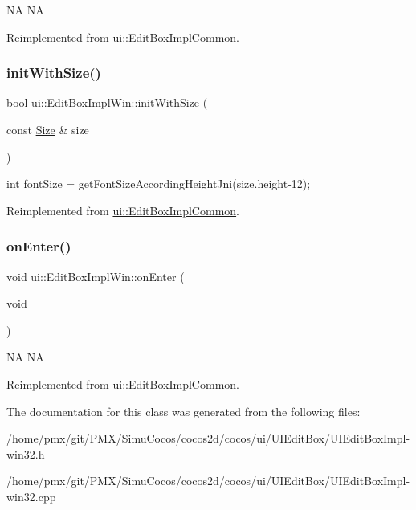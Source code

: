 NA  NA 

Reimplemented from \hyperlink{classui_1_1EditBoxImplCommon_a778a70b2785868a3b8e6953c95277573}{ui\+::\+Edit\+Box\+Impl\+Common}.

\mbox{\label{classui_1_1EditBoxImplWin_a347c134210f455ba359bea055277505e}} 
\subsubsection{\texorpdfstring{init\+With\+Size()}{initWithSize()}}
{\footnotesize\ttfamily bool ui\+::\+Edit\+Box\+Impl\+Win\+::init\+With\+Size (\begin{DoxyParamCaption}\item[{const \hyperlink{classSize}{Size} \&}]{size }\end{DoxyParamCaption})\hspace{0.3cm}{\ttfamily [virtual]}}

int font\+Size = get\+Font\+Size\+According\+Height\+Jni(size.\+height-\/12); 

Reimplemented from \hyperlink{classui_1_1EditBoxImplCommon}{ui\+::\+Edit\+Box\+Impl\+Common}.

\mbox{\label{classui_1_1EditBoxImplWin_a9cdc66776f0b0d70318866b0e4a3bfa7}} 
\subsubsection{\texorpdfstring{on\+Enter()}{onEnter()}}
{\footnotesize\ttfamily void ui\+::\+Edit\+Box\+Impl\+Win\+::on\+Enter (\begin{DoxyParamCaption}\item[{void}]{ }\end{DoxyParamCaption})\hspace{0.3cm}{\ttfamily [virtual]}}

NA  NA 

Reimplemented from \hyperlink{classui_1_1EditBoxImplCommon_a101c957f01d0323c0f9ed0d5f649a408}{ui\+::\+Edit\+Box\+Impl\+Common}.



The documentation for this class was generated from the following files\+:\begin{DoxyCompactItemize}
\item 
/home/pmx/git/\+P\+M\+X/\+Simu\+Cocos/cocos2d/cocos/ui/\+U\+I\+Edit\+Box/U\+I\+Edit\+Box\+Impl-\/win32.\+h\item 
/home/pmx/git/\+P\+M\+X/\+Simu\+Cocos/cocos2d/cocos/ui/\+U\+I\+Edit\+Box/U\+I\+Edit\+Box\+Impl-\/win32.\+cpp\end{DoxyCompactItemize}
